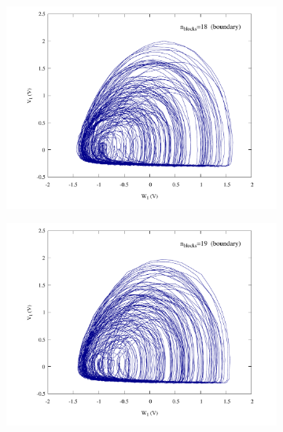 \begin{figure}
    \centering
    \begin{minipage}{.47\textwidth}
        \begin{subfigure}{\linewidth}
            \centering
            \includegraphics[width=\linewidth]
            {../blocks/18_blocks/attractor.pdf}
        \end{subfigure}
    \end{minipage}
    \begin{minipage}{.47\textwidth}
        \begin{subfigure}{\linewidth}
            \centering
            \includegraphics[width=\linewidth]
            {../blocks/19_blocks/edge/attractor.pdf}

\end{subfigure}
\end{minipage}
\end{figure}
